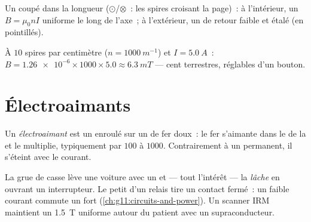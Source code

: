 \begin{omfigure}

{\small Un  coupé dans la longueur
($\odot$/$\otimes$~: les spires croisant la page)~: à l'intérieur, un
$B = \mu_0 n I$ uniforme le long de l'axe~; à l'extérieur, un
 de retour faible et étalé (en
pointillés).}
\end{omfigure}

\begin{example}\label{ex:g11:magnetic-fields:solenoid}
À $10$ spires par centimètre ($n = \qty{1000}{m^{-1}}$) et
$I = \qty{5.0}{A}$~: $B = \num{1.26e-6} \times 1000 \times 5.0 \approx
\qty{6.3}{mT}$ --- cent 
terrestres, réglables d'un bouton.
\end{example}

\section{Électroaimants}

\begin{definition}[Électroaimant]\label{def:g11:magnetic-fields:electromagnet}
Un \emph{électroaimant} est un
 enroulé sur un  de fer doux~:
le fer s'aimante dans le  de la
 et le multiplie, typiquement par $100$ à
$1000$. Contrairement à un
 permanent, il s'éteint avec le courant.
\end{definition}

\begin{remark}\label{rem:g11:magnetic-fields:machines}
La grue de casse lève une voiture avec un
 et --- tout l'intérêt --- la
\emph{lâche} en ouvrant un interrupteur. Le petit
 d'un relais tire un contact
fermé~: un faible courant commute un fort
(\cref{ch:g11:circuits-and-power}). Un scanner IRM maintient un
\qty{1.5}{T} uniforme autour du patient avec un
 supraconducteur.
\end{remark}

